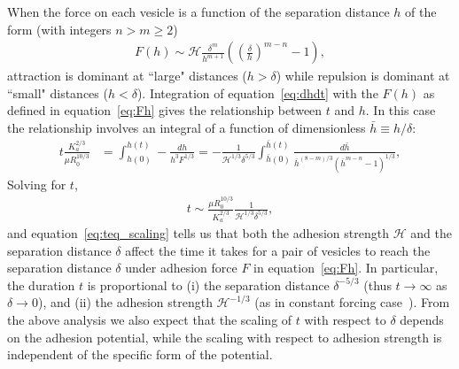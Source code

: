 \documentclass[prf,superscriptaddress,showpacs]{revtex4-1}
\begin{document}
When the force on each vesicle is a function of the separation distance
$h$ of the form (with integers $n>m\ge 2$)
\begin{align}
  \label{eq:Fh}
  F(h) \sim \mathcal{H} \frac{\delta^m}{h^{m+1}}
    \left(\left(\frac{\delta}{h}\right)^{m-n}-1\right),
\end{align}
attraction is dominant at ``large" distances ($h > \delta$) while
repulsion is dominant at ``small" distances ($h<\delta$).  Integration
of equation~\eqref{eq:dhdt} with the $F(h)$ as defined in
equation~\eqref{eq:Fh} gives the relationship between $t$ and $h$.  In
this case the relationship involves an integral of a function of
dimensionless $\bar{h} \equiv h/\delta$:
\begin{align*}
  t\frac{K_a^{2/3}}{\mu R_0^{10/3}}& = 
    \int^{h(t)}_{h(0)}-\frac{dh}{h^3 F^{1/3}} = 
    -\frac{1}{\mathcal{H}^{1/3}\delta^{5/3}}\int^{\bar{h}(t)}_{\bar{h}(0)}
      \frac{d \bar{h}}{\bar{h}^{(8-m)/3}(\bar{h}^{m-n}-1)^{1/3}},
\end{align*}
Solving for $t$,
\begin{align}
\label{eq:teq_scaling}
  t\sim \frac{\mu R_0^{10/3}}{K_a^{2/3}}\frac{1}{\mathcal{H}^{1/3}\delta^{5/3}},
\end{align}
and equation~\eqref{eq:teq_scaling} tells us that both the adhesion
strength $\mathcal{H}$ and the separation distance $\delta$ affect the
time it takes for a pair of vesicles to reach the separation distance
$\delta$ under adhesion force $F$ in equation~\eqref{eq:Fh}.  In
particular, the duration $t$ is proportional to (i) the separation
distance $\delta^{-5/3}$ (thus $t\rightarrow \infty$ as
$\delta\rightarrow 0$), and (ii) the adhesion strength
$\mathcal{H}^{-1/3}$ (as in constant forcing
case~\cite{RamachandranLeal2010_PoF}).  From the above analysis we also
expect that the scaling of $t$ with respect to $\delta$ depends on the
adhesion potential, while the scaling with respect to adhesion strength
is independent of the specific form of the potential.
\end{document}
